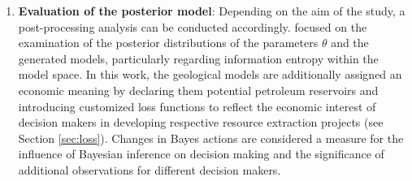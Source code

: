 \begin{enumerate}
        	\item \textbf{Evaluation of the posterior model}: Depending on the aim of the study, a post-processing analysis can be conducted accordingly. \citet{delaVarga2016} focused on the examination of the posterior distributions of the parameters $\theta$ and the generated models, particularly regarding information entropy within the model space. In this work, the geological models are additionally assigned an economic meaning by declaring them potential petroleum reservoirs and introducing customized loss functions to reflect the economic interest of decision makers in developing respective resource extraction projects (see Section \ref{sec:loss}). Changes in Bayes actions are considered a measure for the influence of Bayesian inference on decision making and the significance of additional observations for different decision makers.
        \end{enumerate}
        
